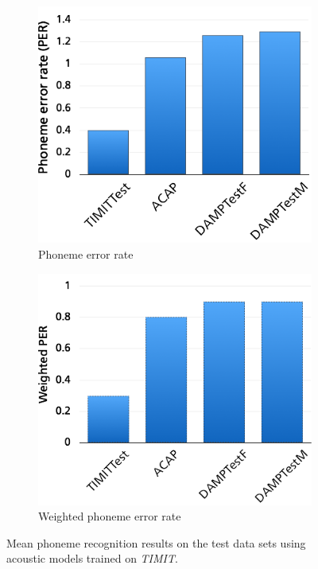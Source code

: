\begin{figure}
	\centering
	\begin{subfigure}[t]{0.4\textwidth}
		\includegraphics[width=\textwidth]{images/res_timit_per.png}
		\caption{Phoneme error rate}
		
	\end{subfigure}%
	\begin{subfigure}[t]{0.4\textwidth}
		\includegraphics[width=\textwidth]{images/res_timit_wper.png}
		\caption{Weighted phoneme error rate}
	\end{subfigure}
	\caption{Mean phoneme recognition results on the test data sets using acoustic models trained on \textit{TIMIT}.}\label{fig:res_timit}
\end{figure}



